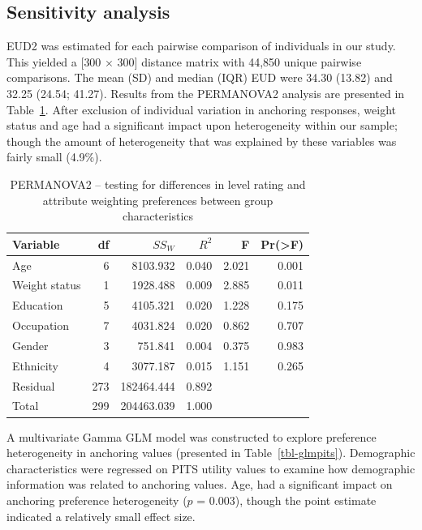 \documentclass[
  number,
  preprint]{elsarticle}
\begin{document}
\subsection{Sensitivity analysis}\label{sensitivity-analysis-1}

EUD2 was estimated for each pairwise comparison of individuals in our
study. This yielded a {[}300 \(\times\) 300{]} distance matrix with
44,850 unique pairwise comparisons. The mean (SD) and median (IQR) EUD
were 34.30 (13.82) and 32.25 (24.54; 41.27). Results from the PERMANOVA2
analysis are presented in Table~\ref{tbl-permanova2}. After exclusion of
individual variation in anchoring responses, weight status and age had a
significant impact upon heterogeneity within our sample; though the
amount of heterogeneity that was explained by these variables was fairly
small (4.9\%).

\begin{longtable}[]{@{}lrrrrr@{}}

\caption{\label{tbl-permanova2}PERMANOVA2 -- testing for differences in
level rating and attribute weighting preferences between group
characteristics}

\tabularnewline

\toprule\noalign{}
Variable & df & \(SS_W\) & \(R^2\) & F & Pr(\textgreater F) \\
\midrule\noalign{}
\endhead
\bottomrule\noalign{}
\endlastfoot
Age & 6 & 8103.932 & 0.040 & 2.021 & 0.001 \\
Weight status & 1 & 1928.488 & 0.009 & 2.885 & 0.011 \\
Education & 5 & 4105.321 & 0.020 & 1.228 & 0.175 \\
Occupation & 7 & 4031.824 & 0.020 & 0.862 & 0.707 \\
Gender & 3 & 751.841 & 0.004 & 0.375 & 0.983 \\
Ethnicity & 4 & 3077.187 & 0.015 & 1.151 & 0.265 \\
Residual & 273 & 182464.444 & 0.892 & & \\
Total & 299 & 204463.039 & 1.000 & & \\

\end{longtable}

A multivariate Gamma GLM model was constructed to explore preference
heterogeneity in anchoring values (presented in
Table~\ref{tbl-glmpits}). Demographic characteristics were regressed on
PITS utility values to examine how demographic information was related
to anchoring values. Age, had a significant impact on anchoring
preference heterogeneity (\(p\) = 0.003), though the point estimate
indicated a relatively small effect size.
\end{document}
